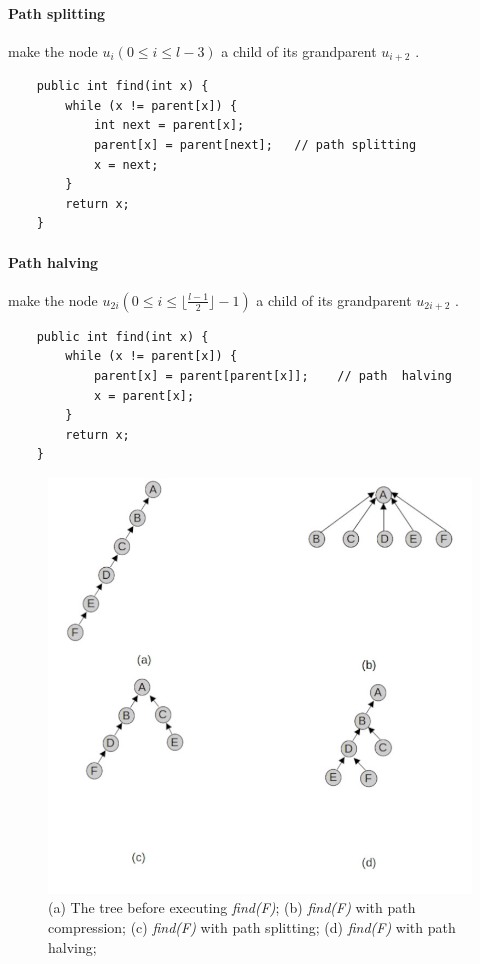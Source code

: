\documentclass{article}
\begin{document}
\paragraph{Path splitting}  make the node $u_i (0 \leq i \leq l-3)$ a child of its grandparent $u_{i+2}$\cite{van1977alternative} \cite{van1980datastructures}. 
\begin{lstlisting}
    public int find(int x) {
        while (x != parent[x]) {
            int next = parent[x];
            parent[x] = parent[next];   // path splitting
            x = next;
        }
        return x;
    }
\end{lstlisting}
\paragraph{Path halving}  make the node $u_{2i} ( 0 \leq i \leq \lfloor \frac{l-1}{2}\rfloor - 1)$ a child 
of its grandparent $u_{2i+2}$\cite{van1977alternative} \cite{van1980datastructures}.
\begin{lstlisting}
    public int find(int x) {
        while (x != parent[x]) {
            parent[x] = parent[parent[x]];    // path  halving
            x = parent[x];
        }
        return x;
    }
\end{lstlisting}
\begin{figure}[h!]
    \includegraphics[width = \linewidth]{img/pc.jpg}
    \caption{(a) The tree before executing \emph{find(F)};
    (b) \emph{find(F)} with path compression;
    (c) \emph{find(F)} with path splitting;
    (d) \emph{find(F)} with path halving;
    }
    \label{fig:pc}   
\end{figure}
\newpage
\end{document}

